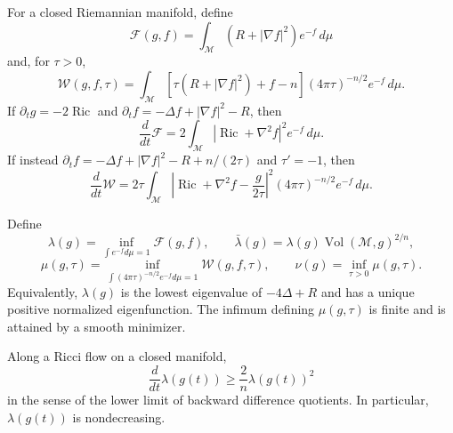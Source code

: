 \begin{definition}
\label{def:chow-ii-appd-perelman-energy-entropy}

For a closed Riemannian manifold, define
\[
 \mathcal F(g,f)=\int_{\mathcal M}(R+|\nabla f|^2)e^{-f}\,d\mu
\]
and, for $\tau>0$,
\[
 \mathcal W(g,f,\tau)=\int_{\mathcal M}
 [\tau(R+|\nabla f|^2)+f-n](4\pi\tau)^{-n/2}e^{-f}\,d\mu.
\]
If $\partial_tg=-2\operatorname{Ric}$ and
$\partial_tf=-\Delta f+|\nabla f|^2-R$, then
\[
 \frac d{dt}\mathcal F=2\int_{\mathcal M}
 |\operatorname{Ric}+\nabla^2f|^2e^{-f}\,d\mu.
\]
If instead $\partial_tf=-\Delta f+|\nabla f|^2-R+n/(2\tau)$ and
$\tau'=-1$, then
\[
 \frac d{dt}\mathcal W=2\tau\int_{\mathcal M}
 \left|\operatorname{Ric}+\nabla^2f-\frac g{2\tau}\right|^2
 (4\pi\tau)^{-n/2}e^{-f}\,d\mu.
\]
\end{definition}

\begin{definition}
\label{def:chow-ii-appd-perelman-invariants}

Define
\[
 \lambda(g)=\inf_{\int e^{-f}d\mu=1}\mathcal F(g,f),\qquad
 \bar\lambda(g)=\lambda(g)\operatorname{Vol}(\mathcal M,g)^{2/n},
\]
\[
 \mu(g,\tau)=\inf_{\int(4\pi\tau)^{-n/2}e^{-f}d\mu=1}
 \mathcal W(g,f,\tau),\qquad
 \nu(g)=\inf_{\tau>0}\mu(g,\tau).
\]
Equivalently, $\lambda(g)$ is the lowest eigenvalue of $-4\Delta+R$ and
has a unique positive normalized eigenfunction. The infimum defining
$\mu(g,\tau)$ is finite and is attained by a smooth minimizer.
\end{definition}

\begin{lemma}
\label{lem:chow-ii-appd-lambda-monotonicity}


Along a Ricci flow on a closed manifold,
\[
 \frac d{dt}\lambda(g(t))\geq\frac2n\lambda(g(t))^2
\]
in the sense of the lower limit of backward difference quotients. In
particular, $\lambda(g(t))$ is nondecreasing.
\end{lemma}

